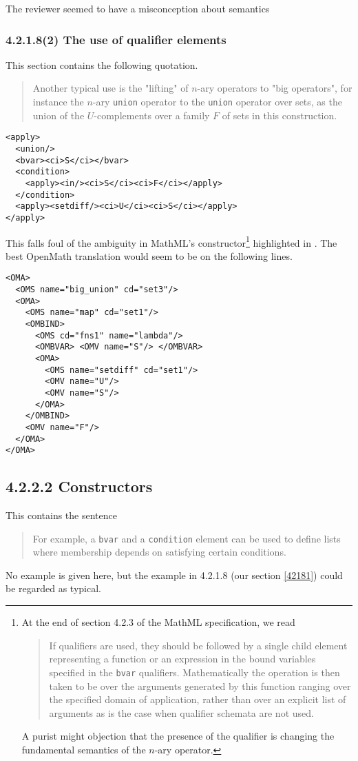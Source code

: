 \documentclass{llncs}
\begin{document}
\begin{newpart}{The reviewer seemed to have a misconception about semantics}
\subsubsection{4.2.1.8(2) The use of qualifier elements}\label{42182}
This section contains the following quotation.
\begin{quotation}\noindent
Another typical use is the "lifting" of $n$-ary operators to "big operators",
for instance the $n$-ary {\tt union} operator to the {\tt union} operator over
sets, as the union of the $U$-complements over a family $F$ of sets in this
construction.
\end{quotation} 
\begin{lstlisting}[language=MathML2]
<apply>
  <union/>
  <bvar><ci>S</ci></bvar>
  <condition>
    <apply><in/><ci>S</ci><ci>F</ci></apply>
  </condition>
  <apply><setdiff/><ci>U</ci><ci>S</ci></apply>
</apply>
\end{lstlisting}
This falls foul of the ambiguity in MathML's {}
constructor\footnote{At the end of section 4.2.3 of the MathML specification,
we read
\begin{quotation}\noindent
If qualifiers are used, they should be followed by a single child element
representing a function or an expression in the bound variables specified in
the {\tt bvar} qualifiers.
Mathematically the operation is then taken to be over the arguments generated
by this function ranging over the specified domain of application, rather than
over an explicit list of arguments as is the case when qualifier schemata are
not used. 
\end{quotation}
A purist might objection that the presence of the qualifier is changing the
fundamental semantics of the $n$-ary operator.}
highlighted in \cite[especially slide 14]{Davenportminor2008}. The best OpenMath
translation would seem to be on the following lines.
\begin{lstlisting}
<OMA>
  <OMS name="big_union" cd="set3"/>
  <OMA>
    <OMS name="map" cd="set1"/>
    <OMBIND>
      <OMS cd="fns1" name="lambda"/>
      <OMBVAR> <OMV name="S"/> </OMBVAR>
      <OMA>
        <OMS name="setdiff" cd="set1"/>
        <OMV name="U"/>
        <OMV name="S"/>
      </OMA>
    </OMBIND>
    <OMV name="F"/>
  </OMA>
</OMA>
\end{lstlisting}
\subsection{4.2.2.2 Constructors}\label{4222}
This contains the sentence
\begin{quotation}\noindent
For example, a {\tt bvar} and a {\tt condition} element can be used to define
lists where membership depends on satisfying certain conditions. 
\end{quotation}
No example is given here, but the example in 4.2.1.8 (our section \ref{42181})
could be regarded as typical.

\end{newpart}
\end{document}
